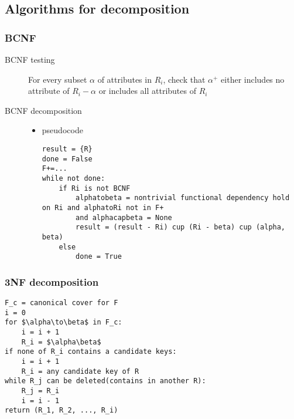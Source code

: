 \documentclass[11pt]{article}
\begin{document}
\subsection{Algorithms for decomposition}
\label{sec-13-7}
\subsubsection{BCNF}
\label{sec-13-7-1}
\begin{description}
\item[{BCNF testing}] For every subset $\alpha$ of attributes in $R_i$, check that $\alpha^+$ either includes no
attribute of $R_i-\alpha$ or includes all attributes of $R_i$
\item[{BCNF decomposition}] \begin{itemize}
\item pseudocode
\lstset{language=Python,label= ,caption= ,numbers=none}
\begin{lstlisting}
result = {R}
done = False
F+=...
while not done:
    if Ri is not BCNF
        alphatobeta = nontrivial functional dependency hold on Ri and alphatoRi not in F+
        and alphacapbeta = None
        result = (result - Ri) cup (Ri - beta) cup (alpha, beta)
    else
        done = True
\end{lstlisting}
\end{itemize}
\end{description}
\subsubsection{3NF decomposition}
\label{sec-13-7-2}
\lstset{language=Python,label= ,caption= ,numbers=none}
\begin{lstlisting}
F_c = canonical cover for F
i = 0
for $\alpha\to\beta$ in F_c:
    i = i + 1
    R_i = $\alpha\beta$
if none of R_i contains a candidate keys:
    i = i + 1
    R_i = any candidate key of R
while R_j can be deleted(contains in another R):
    R_j = R_i
    i = i - 1
return (R_1, R_2, ..., R_i)
\end{lstlisting}
\end{document}
